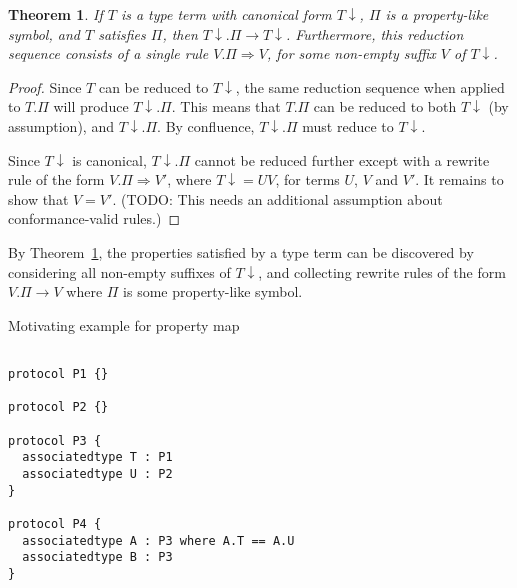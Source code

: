 \documentclass[headsepline,bibliography=totoc]{scrreport}
\newtheorem{theorem}{Theorem}[chapter]
\theoremstyle{definition}
\theoremstyle{definition}
\theoremstyle{definition}
\begin{document}
\begin{theorem}\label{propertymaptheorem} If $T$ is a type term with canonical form ${T}{\downarrow}$, $\Pi$ is a property-like
symbol, and $T$ satisfies $\Pi$, then ${T}{\downarrow}.\Pi\rightarrow{T}{\downarrow}$. Furthermore, this
reduction sequence consists of a single rule $V.\Pi\Rightarrow V$, for some non-empty suffix $V$ of ${T}{\downarrow}$.
\end{theorem}
\begin{proof}
Since $T$ can be reduced to ${T}{\downarrow}$, the same reduction sequence when applied to $T.\Pi$ will
produce ${T}{\downarrow}.\Pi$. This means that $T.\Pi$ can be reduced to both ${T}{\downarrow}$ (by
assumption), and ${T}{\downarrow}.\Pi$. By confluence, ${T}{\downarrow}.\Pi$ must reduce to ${T}{\downarrow}$.

Since ${T}{\downarrow}$ is canonical, ${T}{\downarrow}.\Pi$ cannot be reduced further except with a rewrite rule
of the form $V.\Pi\Rightarrow V'$, where ${T}{\downarrow}=UV$, for terms $U$, $V$ and $V'$. It remains to show
that $V=V'$. (TODO: This needs an additional assumption about conformance-valid rules.)
\end{proof}

By Theorem~\ref{propertymaptheorem}, the properties satisfied by a type term can be discovered by
considering all non-empty suffixes of ${T}{\downarrow}$, and collecting rewrite rules of the form
$V.\Pi\rightarrow V$ where $\Pi$ is some property-like symbol.

\begin{listing}\caption{Motivating example for property map}\label{propmaplisting1}
\begin{Verbatim}

protocol P1 {}

protocol P2 {}

protocol P3 {
  associatedtype T : P1
  associatedtype U : P2
}

protocol P4 {
  associatedtype A : P3 where A.T == A.U
  associatedtype B : P3
}
\end{Verbatim}
\end{listing}
\end{document}
